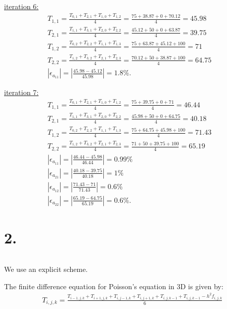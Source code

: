 \documentclass{article}
\begin{document}
\underline{iteration 6:}
\begin{align*}
  &T_{1,1} = \frac{T_{0,1} + T_{2,1} + T_{1,0} + T_{1,2}}{4}
  = \frac{75 + 38.87 + 0 + 70.12}{4} = 45.98 &&\\
  &T_{2,1} = \frac{T_{1,1} + T_{3,1} +  T_{2,0} + T_{2,2}}{4}
  = \frac{45.12 + 50 + 0 + 63.87}{4} = 39.75 &&\\
  &T_{1,2} = \frac{T_{0,2} + T_{2,2} +  T_{1,1} + T_{1,3}}{4}
  = \frac{75 + 63.87 + 45.12 + 100}{4} = 71 &&\\
  &T_{2,2} = \frac{T_{1,2} + T_{3,2} +  T_{2,1} + T_{2,3}}{4}
  = \frac{70.12 + 50 + 38.87 + 100}{4} = 64.75 &&\\
  &\left|\epsilon_{a_{11}}\right| = \left|\frac{45.98 - 45.12}{45.98}\right| = 1.8\%.
\end{align*}

\underline{iteration 7:}
\begin{align*}
  &T_{1,1} = \frac{T_{0,1} + T_{2,1} + T_{1,0} + T_{1,2}}{4}
  = \frac{75 + 39.75 + 0 + 71}{4} = 46.44 &&\\
  &T_{2,1} = \frac{T_{1,1} + T_{3,1} +  T_{2,0} + T_{2,2}}{4}
  = \frac{45.98 + 50 + 0 + 64.75}{4} = 40.18 &&\\
  &T_{1,2} = \frac{T_{0,2} + T_{2,2} +  T_{1,1} + T_{1,3}}{4}
  = \frac{75 + 64.75 + 45.98 + 100}{4} = 71.43 &&\\
  &T_{2,2} = \frac{T_{1,2} + T_{3,2} +  T_{2,1} + T_{2,3}}{4}
  = \frac{71 + 50 + 39.75 + 100}{4} = 65.19 &&\\
  &\left|\epsilon_{a_{11}}\right| = \left|\frac{46.44 - 45.98}{46.44}\right| = 0.99\% &&\\
  &\left|\epsilon_{a_{21}}\right| = \left|\frac{40.18-39.75}{40.18}\right| = 1\% &&\\
  &\left|\epsilon_{a_{12}}\right| = \left|\frac{71.43-71}{71.43}\right| = 0.6\% &&\\
  &\left|\epsilon_{a_{22}}\right| = \left|\frac{65.19-64.75}{65.19}\right| = 0.6\%.
\end{align*}


\section*{2.}
$ $

We use an explicit scheme.
\newline

The finite difference equation for Poisson's equation in 3D is given by:
\begin{align*}
  T_{i,j,k}
  = 
  \frac
  {
  T_{i-1,j,k} + T_{i+1,j,k}
  +
  T_{i,j-1,k} + T_{i,j+1,k}
  +
  T_{i,j,k-1} + T_{i,j,k-1}
  - h^2 f_{i,j,k}
  }
  {6}
\end{align*}
\end{document}

